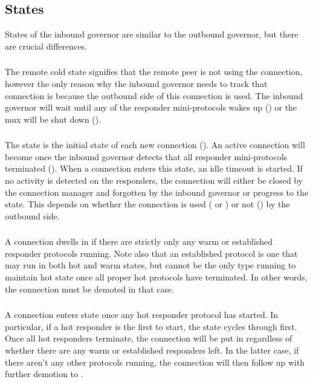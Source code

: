 \subsection{States}

States of the inbound governor are similar to the outbound governor, but there
are crucial differences.

\subsubsection{\RemoteCold}
The remote cold state signifies that the remote peer is not using the
connection, however the only reason why the inbound governor needs to track
that connection is because the outbound side of this connection is used.  The
inbound governor will wait until any of the responder mini-protocols wakes up
(\AwakeRemote{}) or the mux will be shut down (\MuxTerminated{}).

\subsubsection{\RemoteIdle}
The \RemoteIdle{} state is the initial state of each new connection
(\NewConnection{}).  An active connection will become \RemoteIdle{} once the
inbound governor detects that all responder mini-protocols terminated
(\WaitIdleRemote{}).  When a connection enters this state, an idle timeout is
started.  If no activity is detected on the responders, the connection will
either be closed by the connection manager and forgotten by the inbound
governor or progress to the \RemoteCold{} state.  This depends on whether the
connection is used (\warm{} or \hot{}) or not (\cold{}) by the outbound side.

\subsubsection{\RemoteWarm}
A connection dwells in \RemoteWarm{} if there are strictly only any warm or established
responder protocols running. Note also that an established protocol is one that may run
in both hot and warm states, but cannot be the only type running to maintain hot state
once all proper hot protocols have terminated. In other words, the connection must be
demoted in that case.

\subsubsection{\RemoteHot}
A connection enters \RemoteHot{} state once any hot responder protocol has started.
In particular, if a hot responder is the first to start, the state cycles through \RemoteWarm{}
first. Once all hot responders terminate, the connection will be put in \RemoteWarm{} regardless
of whether there are any warm or established responders left. In the latter case, if there aren't any
other protocols running, the connection will then follow up with further demotion to \RemoteIdle{}.

